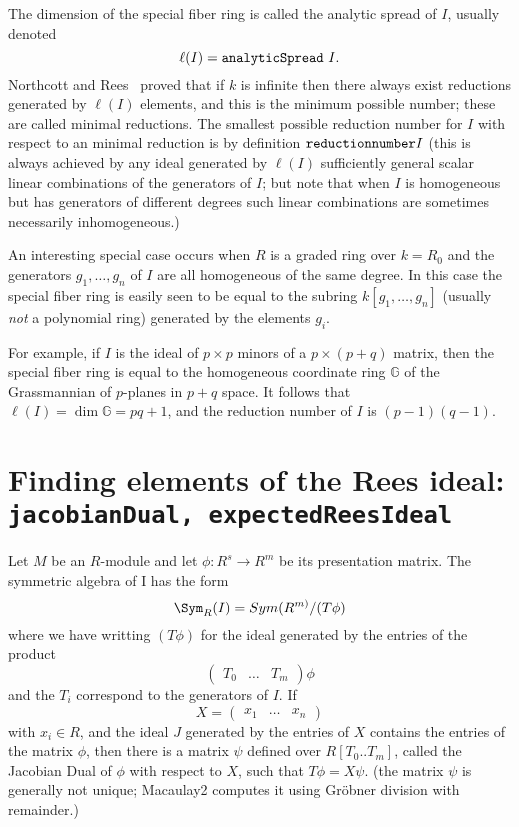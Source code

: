 \documentclass[twoside,12pt, leqno]{amsart}
\begin{document}
The dimension of the special fiber ring is called the analytic spread of $I$, usually
denoted
$$
\ell(I) = {\tt analyticSpread\ }I.
$$
Northcott and Rees~\cite{} proved that if $k$ is infinite then there always exist reductions
generated by $\ell(I)$ elements, and this is the minimum possible number; these are called
minimal reductions. The smallest possible reduction number for $I$ with respect to an minimal reduction is  by definition ${\tt reduction number} I$ (this is always achieved by any ideal generated by $\ell(I)$ sufficiently general scalar linear combinations of the generators of $I$; but note that when $I$ is homogeneous but has generators of different degrees such linear combinations are sometimes necessarily inhomogeneous.)

An interesting special case occurs when $R$ is a graded ring over $k = R_0$ and the generators $g_1,\dots, g_n$ of $I$ are all homogeneous of the same degree. In this case the special fiber ring is easily seen to be equal to the subring $k[g_1,\dots,g_n]$ (usually \emph{not} a polynomial ring) generated by the elements $g_i$.

\def\G{{\mathbb G}}
For example, if $I$ is the ideal of $p\times p$ minors of a $p\times (p+q)$ matrix, then
the special fiber ring is equal to the homogeneous coordinate ring $\G$ of the Grassmannian of
$p$-planes in $p+q$ space. It follows that $\ell(I) = \dim \G = pq+1$, and the reduction number of $I$ is
$(p-1)(q-1)$.

\section{Finding elements of the Rees ideal: {\tt jacobianDual, expectedReesIdeal}}

 
Let $M$ be an $R$-module and let $\phi: R^{s}\to R^{m}$ be its presentation matrix.
     The symmetric algebra of I has the form      
     $$
     \Sym_R(I) = Sym(R^{m)}/(T\phi)
     $$
     where we have writting $(T\phi)$  for the ideal generated by the entries
     of the product 
 $$
\begin{pmatrix}
 T_{0}&\dots&T_{m}
\end{pmatrix}\phi
$$
and the $T_{i}$ correspond to the generators of $I$. If 
     $$
     X = \begin{pmatrix}
x_1&\dots&x_{n}
\end{pmatrix}
$$
     with $x_i \in R$, and the ideal $J$ generated by the entries of $X$ 
     contains the entries of the matrix $\phi$, then there is 
     a matrix $\psi$ defined over $R[T_0..T_m]$, called the Jacobian Dual of $\phi$ with respect to $X$,
     such that $T\phi = X\psi$. (the matrix $\psi$ is generally
     not unique; Macaulay2 computes it using Gr\"obner division with remainder.)
           
\end{document}
